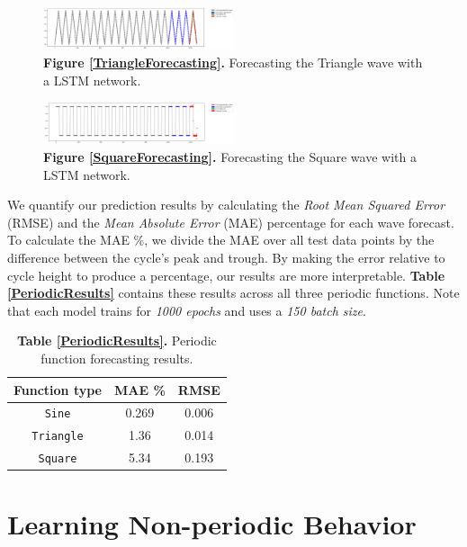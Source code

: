 \documentclass[letterpaper, 10 pt, conference]{ieeeconf}  %
\begin{document}
\label{TriangleForecasting}
\begin{figure}[h]
	\centering
	\includegraphics[width=0.5\textwidth]{assets/triangle_forecast.png}
    \caption{\textbf{Figure \ref{TriangleForecasting}.} Forecasting the Triangle wave with a LSTM network.}
\end{figure}

\label{SquareForecasting}
\begin{figure}[h]
	\centering
	\includegraphics[width=0.5\textwidth]{assets/square_forecast_500epoch.png}
    \caption{\textbf{Figure \ref{SquareForecasting}.} Forecasting the Square wave with a LSTM network.}
\end{figure}

We quantify our prediction results by calculating the \textit{Root Mean Squared Error} (RMSE) and the \textit{Mean Absolute Error} (MAE) percentage for each wave forecast. To calculate the MAE \%, we divide the MAE over all test data points by the difference between the cycle's peak and trough. By making the error relative to cycle height to produce a percentage, our results are more interpretable. \textbf{Table \ref{PeriodicResults}} contains these results across all three periodic functions. Note that each model trains for \textit{1000 epochs} and uses a \textit{150 batch size}.

\label{PeriodicResults}
\begin{table}[h] %
  \centering
  \begin{tabular}{ c | c c }
      Function type & MAE \% & RMSE \\
      \hline
      \verb|Sine| & 0.269  & 0.006 \\
      \verb|Triangle| & 1.36 & 0.014\\
      \verb|Square| & 5.34 & 0.193
  \end{tabular}
  \caption{\textbf{Table \ref{PeriodicResults}.} Periodic function forecasting results.}
\end{table}


\section{Learning Non-periodic Behavior}
\end{document}
